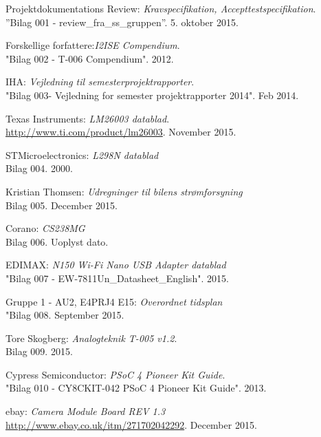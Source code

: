 	\fancyhead[CE,CO]{}
\renewcommand{\bibname}{Litteraturliste}
\begin{thebibliography}{2}

 Projektdokumentations Review: \textit{Kravspecifikation, Accepttestspecifikation}.\\
''Bilag 001 - review\_fra\_ss\_gruppen''. 5. oktober 2015.

 Forskellige forfattere:\textit{I2ISE Compendium}. \\
"Bilag 002 - T-006 Compendium". 2012.

 IHA: \textit{Vejledning til semesterprojektrapporter}. \\
"Bilag 003- Vejledning for semester projektrapporter 2014". Feb 2014.

 Texas Instruments: \textit{LM26003 datablad}. \\
\url{http://www.ti.com/product/lm26003}. November 2015.

 STMicroelectronics: \textit{L298N datablad} \\
Bilag 004. 2000.

 Kristian Thomsen: \textit{Udregninger til bilens strømforsyning} \\
Bilag 005. December 2015.

 Corano: \textit{CS238MG}\\
Bilag 006. Uoplyst dato.

 EDIMAX: \textit{N150 Wi-Fi Nano USB Adapter datablad} \\
"Bilag 007 - EW-7811Un\_Datasheet\_English". 2015.

 Gruppe 1 - AU2, E4PRJ4 E15: \textit{Overordnet tidsplan} \\
"Bilag 008. September 2015.

 Tore Skogberg: \textit{Analogteknik T-005 v1.2}.\\
Bilag 009. 2015.

 Cypress Semiconductor: \textit{PSoC 4 Pioneer Kit Guide}. \\
"Bilag 010 - CY8CKIT-042 PSoC 4 Pioneer Kit Guide". 2013.

 ebay: \textit{Camera Module Board REV 1.3} \\
\url{http://www.ebay.co.uk/itm/271702042292}. December 2015.


\end{thebibliography}
